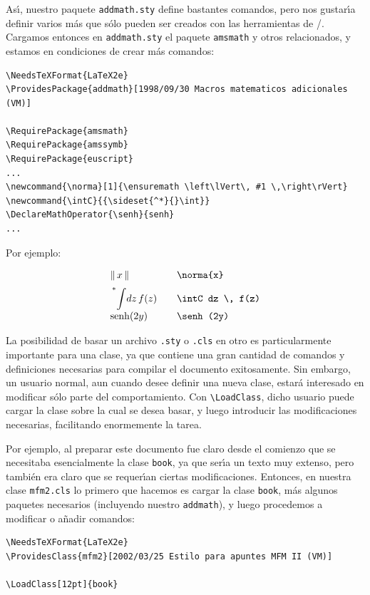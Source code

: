 {As\'{\i}, nuestro paquete \verb+addmath.sty+ define bastantes
comandos, pero nos gustar\'{\i}a definir varios m\'as que s\'olo
pueden ser creados con las herramientas de \amslatex/. Cargamos
entonces en \verb+addmath.sty+ el paquete \verb+amsmath+ y otros
relacionados, y estamos en condiciones de crear m\'as comandos:

\begin{verbatim}
\NeedsTeXFormat{LaTeX2e}
\ProvidesPackage{addmath}[1998/09/30 Macros matematicos adicionales (VM)]

\RequirePackage{amsmath}
\RequirePackage{amssymb}
\RequirePackage{euscript}
...
\newcommand{\norma}[1]{\ensuremath \left\lVert\, #1 \,\right\rVert}
\newcommand{\intC}{{\sideset{^*}{}\int}} 
\DeclareMathOperator{\senh}{senh}
...
\end{verbatim}
Por ejemplo:

$$
\begin{array}{lcl}
 \norma{x}&&  \text{\tt \bslash norma\{x\}} \\[.2cm]
\intC dz \, f(z)&&\text{\tt \bslash intC dz \bslash, f(z)}  \\[.2cm]
\senh (2y) && \text{\tt \bslash senh (2y)}   
\end{array}
$$

La posibilidad de basar un archivo \verb+.sty+ o \verb+.cls+ en otro
es
 particularmente importante para una clase, ya que
 contiene una gran cantidad de comandos y definiciones
necesarias para compilar el documento exitosamente. Sin embargo, un
usuario normal, aun cuando desee definir una nueva clase, estar\'a
interesado en modificar s\'olo parte del comportamiento. Con
\verb+\LoadClass+, dicho usuario puede cargar la clase sobre la cual
se desea basar, y luego introducir las modificaciones necesarias,
facilitando enormemente la tarea.

Por ejemplo, al preparar este documento fue claro desde el comienzo
que se necesitaba esencialmente la clase \verb+book+, ya que
ser\'{\i}a un texto muy extenso, pero tambi\'en era claro que se
requer\'{\i}an ciertas modificaciones. Entonces, en nuestra clase
\verb+mfm2.cls+ lo primero que hacemos es cargar la clase \verb+book+,
m\'as algunos paquetes necesarios (incluyendo nuestro \verb+addmath+), 
y luego procedemos a modificar o a\~nadir comandos:

\begin{verbatim}
\NeedsTeXFormat{LaTeX2e}
\ProvidesClass{mfm2}[2002/03/25 Estilo para apuntes MFM II (VM)]

\LoadClass[12pt]{book}


\end{verbatim}}
